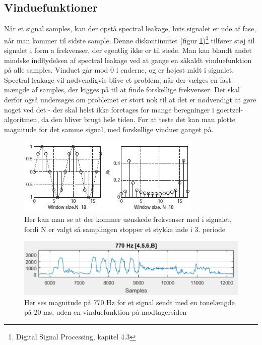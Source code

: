 \subsection{Vinduefunktioner} \label{sec:Windowfunction}

Når et signal samples, kan der opstå spectral leakage, hvis signalet er ude af fase, når man kommer til sidste sample. Denne diskontinuitet (figur \ref{fig:Spectral})\footnote{Digital Signal Processing, kapitel 4.3} tilfører støj til signalet i form a frekvenser, der egentlig ikke er til stede. Man kan blandt andet mindske indflydelsen af spectral leakage ved at gange en såkaldt vinduefunktion på alle samples. Vinduet går mod 0 i enderne, og er højest midt i signalet.\\
Spectral leakage vil nødvendigvis blive et problem, når der vælges en fast mængde af samples, der kigges på til at finde forskellige frekvenser. Det skal derfor også undersøges om problemet er stort nok til at det er nødvendigt at gøre noget ved det - der skal helst ikke foretages for mange beregninger i goertzel-algoritmen, da den bliver brugt hele tiden. For at teste det kan man plotte magnitude for det samme signal, med forskellige vinduer ganget på. 

\begin{figure}[h!]
\centering
\includegraphics[scale=0.8]{Billeder/SpectralLeak.PNG}
\caption{Her kan man se at der kommer uønskede frekvenser med i signalet, fordi N er valgt så samplingen stopper et stykke inde i 3. periode}
\label{fig:Spectral}
\end{figure} 



\begin{figure}[h!]
\centering
\includegraphics[scale=0.8]{Billeder/NoWindow.PNG}
\caption{Her ses magnitude på 770 Hz for et signal sendt med en tonelængde på 20 ms, uden en vinduefunktion på modtagersiden}
\label{fig:NoWindow}
\end{figure}

